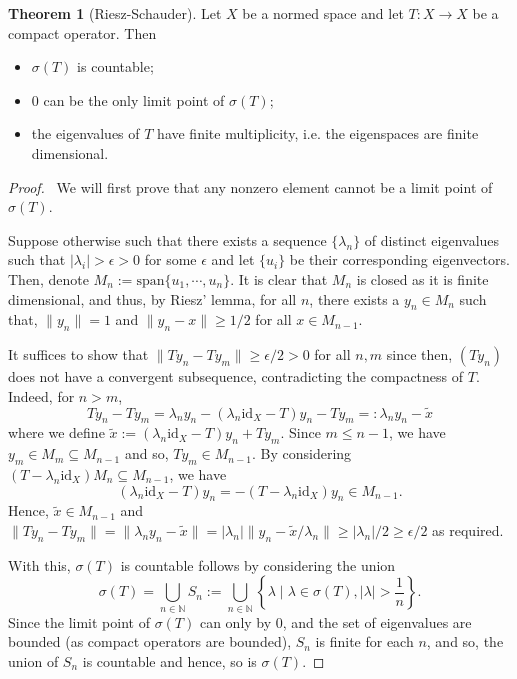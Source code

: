 \documentclass[]{article}
\theoremstyle{definition}
\newtheorem{theorem}{Theorem}
\theoremstyle{definition}
\begin{document}
\begin{theorem}[Riesz-Schauder]
  Let \(X\) be a normed space and let \(T : X \to X\) be a compact operator. Then 
  \begin{itemize}
    \item \(\sigma(T)\) is countable;
    \item 0 can be the only limit point of \(\sigma(T)\);
    \item the eigenvalues of \(T\) have finite multiplicity, i.e. the eigenspaces 
      are finite dimensional.
  \end{itemize}
\end{theorem}
\begin{proof}\ 
  We will first prove that any nonzero element cannot be a limit point of 
  \(\sigma(T)\). 
  
  Suppose otherwise such that there exists a sequence
  \(\{\lambda_n\}\) of distinct eigenvalues such 
  that \(|\lambda_i| > \epsilon > 0\) for some \(\epsilon\) and let 
  \(\{u_i\}\) be their corresponding eigenvectors. Then, denote 
  \(M_n := \text{span}\{u_1, \cdots, u_n\}\). It is clear that \(M_n\) is 
  closed as it is finite dimensional, and thus, by Riesz' lemma, for all 
  \(n\), there exists a \(y_n \in M_n\) such that, \(\|y_n\| = 1\) and 
  \(\|y_n - x\| \ge 1 / 2\) for all \(x \in M_{n - 1}\).

  It suffices to show that \(\|Ty_n - Ty_m\| \ge \epsilon / 2 > 0\) for all 
  \(n, m\) since then, \((Ty_n)\) does not have a convergent subsequence, 
  contradicting the compactness of \(T\). Indeed, for \(n > m\), 
  \[Ty_n - Ty_m = \lambda_n y_n - (\lambda_n \text{id}_X - T)y_n - Ty_m
    =: \lambda_n y_n - \tilde x\]
  where we define \(\tilde x := (\lambda_n \text{id}_X - T)y_n + Ty_m\).
  Since \(m \le n - 1\), we have \(y_m \in M_m \subseteq M_{n - 1}\) and so, 
  \(Ty_m \in M_{n - 1}\). By considering 
  \((T - \lambda_n \text{id}_X)M_n \subseteq M_{n - 1}\), we have
  \[(\lambda_n\text{id}_X - T)y_n = - (T - \lambda_n\text{id}_X)y_n \in M_{n - 1}.\]
  Hence, \(\tilde x \in M_{n - 1}\) and \(\|Ty_n - Ty_m\| = \|\lambda_n y_n - \tilde x\| 
  = |\lambda_n| \|y_n - \tilde x / \lambda_n\| \ge |\lambda_n| / 2 \ge \epsilon / 2\) 
  as required.

  With this, \(\sigma(T)\) is countable follows by considering the union 
  \[\sigma(T) = \bigcup_{n \in \mathbb{N}} S_n := \bigcup_{n \in \mathbb{N}} 
  \left\{\lambda \mid \lambda \in \sigma(T), |\lambda| > \frac{1}{n}\right\}.\]
  Since the limit point of \(\sigma(T)\) can only by 0, and the set of 
  eigenvalues are bounded (as compact operators are bounded), 
  \(S_n\) is finite for each \(n\), and so, the union of \(S_n\) is 
  countable and hence, so is \(\sigma(T)\).


\end{proof}
\end{document}
